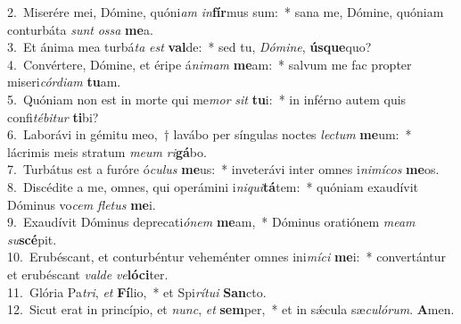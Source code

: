 {2.~}Miserére mei, Dómine, quóni\textit{am} \textit{in}\textbf{fír}mus sum:~* sana me, Dómine, quóniam conturbáta \textit{sunt} \textit{os}\textit{sa} \textbf{me}a.\\
{3.~}Et ánima mea turbá\textit{ta} \textit{est} \textbf{val}de:~* sed tu, \textit{Dó}\textit{mi}\textit{ne}, \textbf{ús}\textbf{que}quo?\\
{4.~}Convértere, Dómine, et éripe á\textit{ni}\textit{mam} \textbf{me}am:~* salvum me fac propter miseri\textit{cór}\textit{di}\textit{am} \textbf{tu}am.\\
{5.~}Quóniam non est in morte qui me\textit{mor} \textit{sit} \textbf{tu}i:~* in inférno autem quis confi\textit{té}\textit{bi}\textit{tur} \textbf{ti}bi?\\
{6.~}Laborávi in gémitu meo,~† lavábo per síngulas noctes \textit{le}\textit{ctum} \textbf{me}um:~* lácrimis meis stratum \textit{me}\textit{um} \textit{ri}\textbf{gá}bo.\\
{7.~}Turbátus est a furóre ó\textit{cu}\textit{lus} \textbf{me}us:~* inveterávi inter omnes i\textit{ni}\textit{mí}\textit{cos} \textbf{me}os.\\
{8.~}Discédite a me, omnes, qui operámini i\textit{ni}\textit{qui}\textbf{tá}tem:~* quóniam exaudívit Dóminus vo\textit{cem} \textit{fle}\textit{tus} \textbf{me}i.\\
{9.~}Exaudívit Dóminus deprecati\textit{ó}\textit{nem} \textbf{me}am,~* Dóminus oratiónem \textit{me}\textit{am} \textit{su}\textbf{scé}pit.\\
{10.~}Erubéscant, et conturbéntur veheménter omnes ini\textit{mí}\textit{ci} \textbf{me}i:~* convertántur et erubéscant \textit{val}\textit{de} \textit{ve}\textbf{ló}\textbf{ci}ter.\\
{11.~}Glória Pa\textit{tri}, \textit{et} \textbf{Fí}lio,~* et Spi\textit{rí}\textit{tu}\textit{i} \textbf{San}cto.\\
{12.~}Sicut erat in princípio, et \textit{nunc}, \textit{et} \textbf{sem}per,~* et in sǽcula sæ\textit{cu}\textit{ló}\textit{rum}. \textbf{A}men.\\
